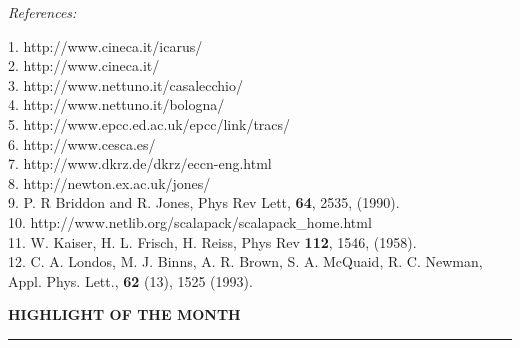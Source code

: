 {\bigskip
{\large \it References:}
\smallskip

1.  http://www.cineca.it/icarus/              \\
2.  http://www.cineca.it/                     \\
3.  http://www.nettuno.it/casalecchio/        \\
4.  http://www.nettuno.it/bologna/            \\
5.  http://www.epcc.ed.ac.uk/epcc/link/tracs/ \\
6.  http://www.cesca.es/		      \\
7.  http://www.dkrz.de/dkrz/eccn-eng.html     \\
8.  http://newton.ex.ac.uk/jones/             \\
9.  P. R Briddon and R. Jones, Phys Rev Lett, {\bf 64}, 2535, (1990). \\
10. http://www.netlib.org/scalapack/scalapack\_home.html \\
11. W. Kaiser, H. L. Frisch, H. Reiss, Phys Rev {\bf 112}, 1546, (1958). \\
12. C. A. Londos, M. J. Binns, A. R. Brown, S. A. McQuaid,
     R. C. Newman, Appl. Phys. Lett., {\bf 62} (13), 1525 (1993). \\


\newpage
\null
\begin{center}
\Large {\bf HIGHLIGHT OF THE MONTH}
\end{center}
\vspace{1cm}
\rule{16.5cm}{1mm}
\vspace{1cm}
%
%


}
